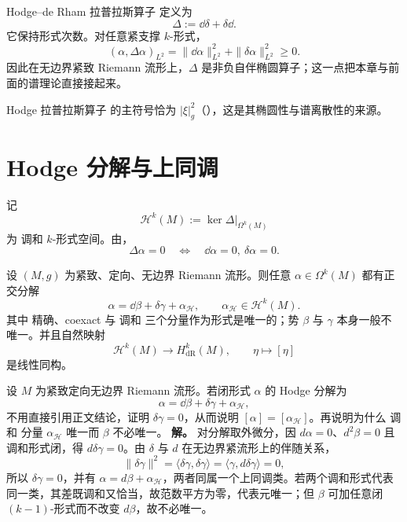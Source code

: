 Hodge--de Rham 拉普拉斯算子 定义为
\begin{equation*}\Delta:=\dd\delta+\delta\dd.
\end{equation*}
它保持形式次数。对任意紧支撑 $k$-形式，
\begin{equation}\label{eq:math-dg-hodge-energy}
(\alpha,\Delta\alpha)_{L^2}
=\|\dd\alpha\|_{L^2}^2+\|\delta\alpha\|_{L^2}^2\ge0.
\end{equation}
因此在无边界紧致 Riemann 流形上，$\Delta$ 是非负自伴椭圆算子；这一点把本章与前面的谱理论直接接起来。

Hodge 拉普拉斯算子 的主符号恰为 $|\xi|_g^2$（），这是其椭圆性与谱离散性的来源。

\section{Hodge 分解与上同调}

记
\[
\mathcal H^k(M):=\ker\Delta\big|_{\Omega^k(M)}
\]
为 调和 $k$-形式空间。由，
\begin{equation}\label{eq:math-dg-harmonic-closed-coclosed}
\Delta\alpha=0
\quad\Longleftrightarrow\quad
\dd\alpha=0,
\ \delta\alpha=0.
\end{equation}

\begin{theorem}\label{thm:math-dg-hodge-decomposition}
设 $(M,g)$ 为紧致、定向、无边界 Riemann 流形。则任意 $\alpha\in\Omega^k(M)$ 都有正交分解
\begin{equation}\label{eq:math-dg-hodge-decomposition}
{
\alpha=\dd\beta+\delta\gamma+\alpha_{\mathcal H},
\qquad
\alpha_{\mathcal H}\in\mathcal H^k(M).}
\end{equation}
其中 精确、coexact 与 调和 三个分量作为形式是唯一的；势 $\beta$ 与 $\gamma$ 本身一般不唯一。并且自然映射
\begin{equation*}\mathcal H^k(M)\longrightarrow H_{\mathrm{dR}}^k(M),
\qquad
\eta\longmapsto[\eta]
\end{equation*}
是线性同构。
\end{theorem}


\par
\begin{workedexample}
设 \(M\) 为紧致定向无边界 Riemann 流形。若闭形式 \(\alpha\) 的 Hodge 分解为
\[
\alpha=\dd\beta+\delta\gamma+\alpha_{\mathcal H},
\]
不用直接引用正文结论，证明 \(\delta\gamma=0\)，从而说明 \([\alpha]=[\alpha_{\mathcal H}]\)。再说明为什么 调和 分量 \(\alpha_{\mathcal H}\) 唯一而 \(\beta\) 不必唯一。
\textbf{解。} 对分解取外微分，因 \(d\alpha=0\)、\(d^2\beta=0\) 且调和形式闭，得 \(d\delta\gamma=0\)。由 \(\delta\) 与 \(d\) 在无边界紧流形上的伴随关系，
\[
\|\delta\gamma\|^2=\langle\delta\gamma,\delta\gamma\rangle
=\langle\gamma,d\delta\gamma\rangle=0,
\]
所以 \(\delta\gamma=0\)，并有 \(\alpha=d\beta+\alpha_{\mathcal H}\)，两者同属一个上同调类。若两个调和形式代表同一类，其差既调和又恰当，故范数平方为零，代表元唯一；但 \(\beta\) 可加任意闭 \((k-1)\)-形式而不改变 \(d\beta\)，故不必唯一。
\end{workedexample}
\par

